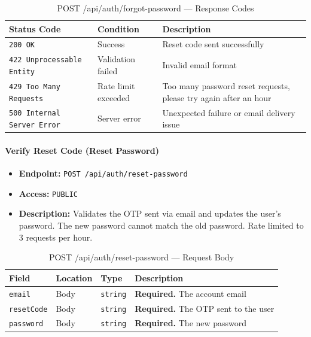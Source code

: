 \begin{table}[H]
\centering
\renewcommand{\arraystretch}{1.3}
\begin{tabularx}{\textwidth}{|l|l|X|}
\hline
\textbf{Status Code} & \textbf{Condition} & \textbf{Description} \\
\hline
\texttt{200 OK}           & Success            & Reset code sent successfully \\
\hline
\texttt{422 Unprocessable Entity} & Validation failed & Invalid email format \\
\hline
\texttt{429 Too Many Requests} & Rate limit exceeded & Too many password reset requests, please try again after an hour \\
\hline
\texttt{500 Internal Server Error} & Server error & Unexpected failure or email delivery issue \\
\hline
\end{tabularx}
\caption{POST /api/auth/forgot-password — Response Codes}
\label{tab:forgot-password-responses}
\end{table}
\FloatBarrier

\paragraph{Verify Reset Code (Reset Password)}
\label{subsubsec:reset-password}

\begin{itemize}
  \item \textbf{Endpoint:} \texttt{POST /api/auth/reset-password}
  \item \textbf{Access:} \texttt{PUBLIC}
  \item \textbf{Description:} Validates the OTP sent via email and updates the user's password. The new password cannot match the old password. Rate limited to 3 requests per hour.
\end{itemize}

\begin{table}[H]
\centering
\renewcommand{\arraystretch}{1.3}
\begin{tabularx}{\textwidth}{|l|l|l|X|}
\hline
\textbf{Field} & \textbf{Location} & \textbf{Type} & \textbf{Description} \\
\hline
\texttt{email}     & Body & \texttt{string} & \textbf{Required.} The account email \\
\hline
\texttt{resetCode} & Body & \texttt{string} & \textbf{Required.} The OTP sent to the user \\
\hline
\texttt{password}  & Body & \texttt{string} & \textbf{Required.} The new password \\
\hline
\end{tabularx}
\caption{POST /api/auth/reset-password — Request Body}
\label{tab:reset-password-body}
\end{table}


